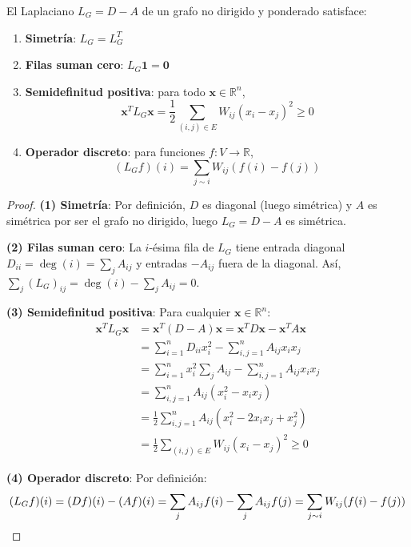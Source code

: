 \begin{proposition}\label{prop:propiedades_algebraicas_laplaciano}
	El Laplaciano $L_G = D - A$ de un grafo no dirigido y ponderado satisface:
	\begin{enumerate}
		\item \textbf{Simetría}: $L_G = L_G^T$
		\item \textbf{Filas suman cero}: $L_G \mathbf{1} = \mathbf{0}$
		\item \textbf{Semidefinitud positiva}: para todo $\mathbf{x} \in \mathbb{R}^n$,
		\[
			\mathbf{x}^T L_G \mathbf{x} = \frac{1}{2}\sum_{(i,j)\in E} W_{ij}(x_i - x_j)^2 \geq 0
		\]
		\item \textbf{Operador discreto}: para funciones $f: V \to \mathbb{R}$,
		\[
			(L_G f)(i) = \sum_{j\sim i} W_{ij}(f(i)-f(j))
		\]
	\end{enumerate}
\end{proposition}

\begin{proof}
	\textbf{(1) Simetría}: Por definición, $D$ es diagonal (luego simétrica) y $A$ es simétrica por ser el grafo no dirigido, luego $L_G = D - A$ es simétrica.

	\textbf{(2) Filas suman cero}: La $i$-ésima fila de $L_G$ tiene entrada diagonal $D_{ii} = \deg(i) = \sum_j A_{ij}$ y entradas $-A_{ij}$ fuera de la diagonal. Así, $\sum_j (L_G)_{ij} = \deg(i) - \sum_j A_{ij} = 0$.

	\textbf{(3) Semidefinitud positiva}: Para cualquier $\mathbf{x} \in \mathbb{R}^n$:
	\begin{align}
		\mathbf{x}^T L_G \mathbf{x} &= \mathbf{x}^T (D - A) \mathbf{x} = \mathbf{x}^T D \mathbf{x} - \mathbf{x}^T A \mathbf{x}\\
		&= \sum_{i=1}^n D_{ii} x_i^2 - \sum_{i,j=1}^n A_{ij} x_i x_j\\
		&= \sum_{i=1}^n x_i^2 \sum_{j} A_{ij} - \sum_{i,j=1}^n A_{ij} x_i x_j\\
		&= \sum_{i,j=1}^n A_{ij} (x_i^2 - x_i x_j)\\
		&= \frac{1}{2} \sum_{i,j=1}^n A_{ij} (x_i^2 - 2x_i x_j + x_j^2)\\
		&= \frac{1}{2} \sum_{(i,j) \in E} W_{ij} (x_i - x_j)^2 \geq 0
	\end{align}

	\textbf{(4) Operador discreto}: Por definición:
	\[
		(L_G f)(i) = (Df)(i) - (Af)(i) = \sum_{j} A_{ij} f(i) - \sum_{j} A_{ij} f(j) = \sum_{j \sim i} W_{ij}(f(i) - f(j)) \qedhere
	\]
\end{proof}

